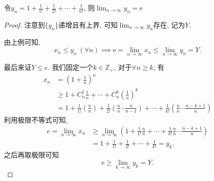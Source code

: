 
\begin{proposition}
    令$y_n = 1 + \frac{1}{1!} + \frac{1}{2!} + \cdots + \frac{1}{n!}$, 则$\displaystyle \lim_{n \to \infty}y_n = \mathrm{e}$
\end{proposition}
\begin{proof}
    注意到$\{ y_n \}$递增且有上界, 可知$\displaystyle \lim_{n \to \infty}y_n$存在, 记为$Y$.

    由上例可知,
    \begin{equation}
      x_n\le y_n \ \left( \forall n \right) \implies \mathrm{e}=\lim_{n \to \infty}x_n \le \lim_{n \to \infty}y_n = Y.
    \end{equation}

    最后来证$Y\le e$. 我们固定一个$k\in \mathbb{Z}_{+}$, 对于$\forall n\ge k$, 有
    \begin{equation}
      \begin{aligned}
        x_n & = \left( 1+\frac{1}{n} \right) ^{n}
        \\
        & \ge 1 + C_{n}^{1} \frac{1}{n} + \cdots + C_{n}^{k} \left( \frac{1}{n} \right) ^{k}
        \\
        & = 1 + \frac{1}{1!}\left( \frac{n}{n} \right) + \frac{1}{2!}\left( \frac{n}{n} \cdot \frac{n}{n-1} \right) + \cdots + \frac{1}{k!} \left( \frac{n}{n}\cdots \frac{n-k+1}{n} \right) 
      \end{aligned}
    \end{equation}
    利用极限不等式可知, 
    \begin{equation}
      \begin{aligned}
        e = \lim_{n \to \infty}x_n & \ge \lim_{n \to \infty} \left( 1 + \frac{1}{1!} \frac{n}{n} + \cdots + \frac{1}{k!} \frac{n}{n} \cdots \frac{n-k+1}{n} \right) 
        \\
        & = 1 + \frac{1}{1!} + \frac{1}{2!} + \cdots +\frac{1}{k!} = y_k.
      \end{aligned}
    \end{equation}
      之后再取极限可知
    \begin{equation}
      \mathrm{e} \ge \lim_{k \to \infty} y_k = Y.
    \end{equation}
\end{proof}

